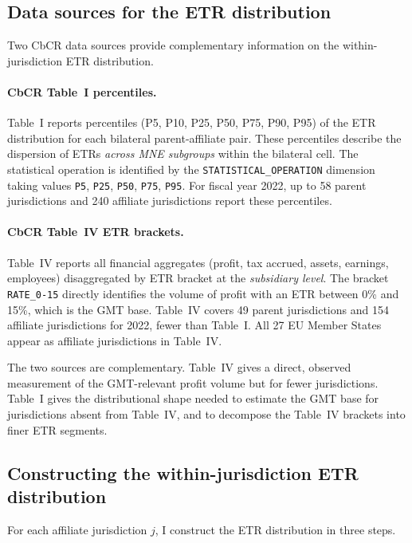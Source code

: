 \documentclass[11pt,a4paper]{article}
\newcommand{\code}[1]{\texttt{#1}}
\begin{document}
\subsection{Data sources for the ETR distribution}\label{sec:etr_dist_data}

Two CbCR data sources provide complementary information on the within-jurisdiction ETR distribution.

\paragraph{CbCR Table~I percentiles.} Table~I reports percentiles (P5, P10, P25, P50, P75, P90, P95) of the ETR distribution for each bilateral parent-affiliate pair. These percentiles describe the dispersion of ETRs \emph{across MNE subgroups} within the bilateral cell. The statistical operation is identified by the \code{STATISTICAL\_OPERATION} dimension taking values \code{P5}, \code{P25}, \code{P50}, \code{P75}, \code{P95}. For fiscal year 2022, up to 58 parent jurisdictions and 240 affiliate jurisdictions report these percentiles.

\paragraph{CbCR Table~IV ETR brackets.} Table~IV reports all financial aggregates (profit, tax accrued, assets, earnings, employees) disaggregated by ETR bracket at the \emph{subsidiary level}. The bracket \code{RATE\_0-15} directly identifies the volume of profit with an ETR between 0\% and 15\%, which is the GMT base. Table~IV covers 49 parent jurisdictions and 154 affiliate jurisdictions for 2022, fewer than Table~I. All 27 EU Member States appear as affiliate jurisdictions in Table~IV.

The two sources are complementary. Table~IV gives a direct, observed measurement of the GMT-relevant profit volume but for fewer jurisdictions. Table~I gives the distributional shape needed to estimate the GMT base for jurisdictions absent from Table~IV, and to decompose the Table~IV brackets into finer ETR segments.

\subsection{Constructing the within-jurisdiction ETR distribution}\label{sec:etr_dist}

For each affiliate jurisdiction $j$, I construct the ETR distribution in three steps.
\end{document}
